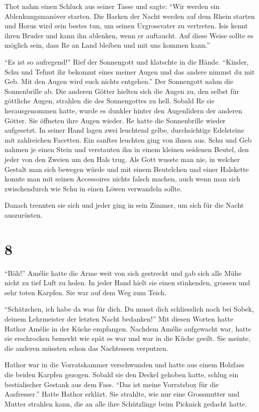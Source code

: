 \documentclass[11pt,titlepage,a5paper]{book}
\begin{document}
Thot nahm einen Schluck aus seiner Tasse und sagte: "`Wir werden ein Ablenkungsmanöver starten. Die Barken der Nacht werden auf dem Rhein starten und Horus wird sein bestes tun, um seinen Urgrossvater zu vertreten. Isis kennt ihren Bruder und kann ihn ablenken, wenn er auftaucht. Auf diese Weise sollte es möglich sein, dass Re an Land bleiben und mit uns kommen kann."'

"`Es ist so aufregend!"' Rief der Sonnengott und klatschte in die Hände. "`Kinder, Schu und Tefnut ihr bekommt eines meiner Augen und das andere nimmst du mit Geb. Mit den Augen wird euch nichts entgehen."' Der Sonnengott nahm die Sonnenbrille ab. Die anderen Götter hielten sich die Augen zu, den selbst für göttliche Augen, strahlen die des Sonnengottes zu hell. Sobald Re sie herausgenommen hatte, wurde es dunkler hinter den Augenlidern der anderen Götter. Sie öffneten ihre Augen wieder. Re hatte die Sonnenbrille wieder aufgesetzt. In seiner Hand lagen zwei leuchtend gelbe, durchsichtige Edelsteine mit zahlreichen Facetten. Ein sanftes leuchten ging von ihnen aus. Schu und Geb nahmen je einen Stein und verstauten ihn in einem kleinen seidenen Beutel, den jeder von den Zweien um den Hals trug. Als Gott wusste man nie, in welcher Gestalt man sich bewegen würde und mit einem Beutelchen und einer Halskette konnte man mit seinen Accessoires nichts falsch machen, auch wenn man sich zwischendurch wie Schu in einen Löwen verwandeln sollte.

 Danach trennten sie sich und jeder ging in sein Zimmer, um sich für die Nacht auszurüsten.
 
\section*{8}
 
 "`Bäh!"' Amélie hatte die Arme weit von sich gestreckt und gab sich alle Mühe nicht zu tief Luft zu holen. In jeder Hand hielt sie einen stinkenden, grossen und sehr toten Karpfen. Sie war auf dem Weg zum Teich.
 
 "`Schätzchen, ich habe da was für dich. Du musst dich schliesslich noch bei Sobek, deinem Lehrmeister der letzten Nacht bedanken!"' Mit diesen Worten hatte Hathor Amélie in der Küche empfangen. Nachdem Amélie aufgewacht war, hatte sie erschrocken bemerkt wie spät es war und war in die Küche geeilt. Sie meinte, die anderen müssten schon das Nachtessen verputzen.
 
Hathor war in die Vorratskammer verschwunden und hatte aus einem Holzfass die beiden Karpfen gezogen. Sobald sie den Deckel gehoben hatte, schlug ein bestialischer Gestank aus dem Fass. "`Das ist meine Vorratsbox für die Aasfresser."' Hatte Hathor erklärt. Sie strahlte, wie nur eine Grossmutter und Mutter strahlen kann, die an alle ihre Schützlinge beim Picknick gedacht hatte.
\end{document}
